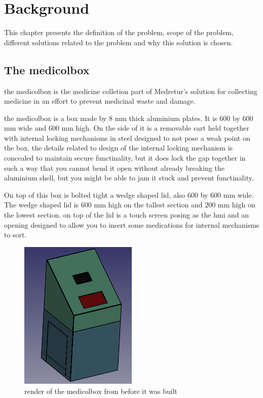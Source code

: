 \documentclass[../main.tex]{subfiles}
\begin{document}
\pagebreak
\section{Background}

This chapter presents the definition of the problem,
scope of the problem,
different solutions related to the problem and
why this solution is chosen.

\subsection{The \gls{medicolbox}}

the \gls{medicolbox} is the medicine colletion part of Medretur’s solution for collecting medicine in an effort to prevent medicinal waste and damage.

the \gls{medicolbox} is a box made by $8$ mm thick aluminium plates. It is $600$ by $600$ mm wide and $600$ mm high.
On the side of it is a removable cart held together with internal locking mechanisms in steel designed to not pose a weak point on the box.
the details related to design of the internal locking mechanism is concealed to maintain secure functinality, but it does lock the gap together in such a way that you cannot bend it open without already breaking the aluminium shell, but you might be able to jam it stuck and prevent functinality.

On top of this box is bolted tight a wedge shaped lid, also $600$ by $600$ mm wide.
The wedge shaped lid is $600$ mm high on the tallest section and $200$ mm high on the lowest section.
on top of the lid is a touch screen posing as the \gls{hmi} and an opening designed to allow you to insert some medications for internal mechanisms to sort.

\begin{figure}[htbp]
    \centering
    \includegraphics[width=0.5\textwidth]{resources/images/MediColBox.png}
    \caption{render of the \gls{medicolbox} from before it was built}
    \label{fig:medicolbox_render}
\end{figure}
\end{document}

